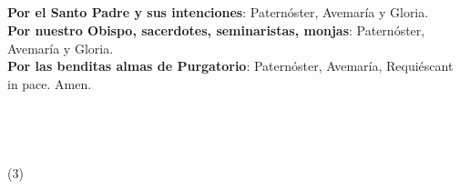 \documentclass[9pt]{article}
\begin{document}
\begin{multicols*}{2}
    \vspace{2mm}

    \\[1mm]
    \\[1mm]
    \\[1mm]
    

    \vspace{2mm}

    \\

    \textbf{Por el Santo Padre y sus intenciones}: Paternóster, Avemaría y Gloria.\\[1mm]
    \textbf{Por nuestro Obispo, sacerdotes, seminaristas, monjas}: Paternóster, Avemaría y Gloria.\\[1mm]
    \textbf{Por las benditas almas de Purgatorio}: Paternóster, Avemaría, Requiéscant in pace. Amen.\\

    \\
    \\
    \\
    \\
    (3)\\[1mm]
    \\[1mm]
    


    \\
    \\
    \\
    

\end{multicols*}
\end{document}
